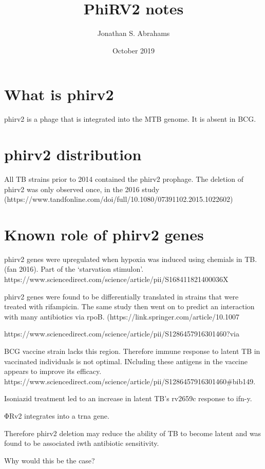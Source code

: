 \documentclass{article}
\title{PhiRV2 notes}
\author{Jonathan S. Abrahams }
\date{October 2019}
\begin{document}
\maketitle

\section{What is phirv2}

phirv2 is a phage that is integrated into the MTB genome. It is absent in BCG.
\section{phirv2 distribution}

All TB strains prior to 2014 contained the phirv2 prophage. The deletion of phirv2 was only observed once, in the 2016 study (https://www.tandfonline.com/doi/full/10.1080/07391102.2015.1022602)

\section{Known role of phirv2 genes}

phirv2 genes were upregulated when hypoxia was induced using chemials in TB. (fan 2016). Part of the `starvation stimulon'. https://www.sciencedirect.com/science/article/pii/S168411821400036X


phirv2 genes were found to be differentially translated in strains that were treated with rifampicin. The same study then went on to predict an interaction with many antibiotics via rpoB. (https://link.springer.com/article/10.1007%


https://www.sciencedirect.com/science/article/pii/S1286457916301460?via%

BCG vaccine strain lacks this region. Therefore immune response to latent TB in vaccinated individuals is not optimal. INcluding these antigens in the vaccine appears to improve its efficacy.
https://www.sciencedirect.com/science/article/pii/S1286457916301460#bib149.

Isoniazid treatment led to an increase in latent TB's rv2659c response to ifn-y.

ΦRv2 integrates into a trna gene.

Therefore phirv2 deletion may reduce the ability of TB to become latent and was found to be associated iwth antibiotic sensitivity.

Why would this be the case?
\end{document}
